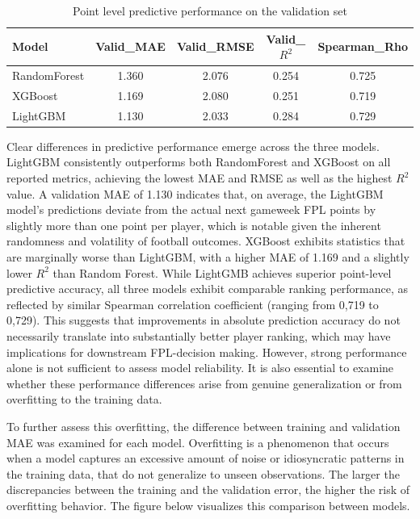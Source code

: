 \documentclass[11pt,a4paper]{article}
\begin{document}
\begin{table}[H]
\centering
\caption{Point level predictive performance on the validation set}
\label{tab:performance}
\begin{tabular}{|l|c|c|c|c|}
\hline
\textbf{Model} & \textbf{Valid\_MAE} & \textbf{Valid\_RMSE} & \textbf{Valid\_$R^2$} & \textbf{Spearman\_Rho}\\
\hline
RandomForest & 1.360 & 2.076 & 0.254 & 0.725 \\
XGBoost & 1.169 & 2.080 & 0.251 & 0.719\\
LightGBM & 1.130 & 2.033 & 0.284 & 0.729\\
\hline
\end{tabular}
\end{table}
Clear differences in predictive performance emerge across the three models. LightGBM consistently outperforms both RandomForest and XGBoost on all reported metrics,  achieving the lowest MAE and RMSE as well as the highest $R^2$ value. A validation MAE of 1.130 indicates that, on average, the LightGBM model’s predictions deviate from the actual next gameweek FPL points by slightly more than one point per player, which is notable given the inherent randomness and volatility of football outcomes. XGBoost exhibits statistics that are marginally worse than LightGBM, with a higher MAE of 1.169 and a slightly lower $R^2$ than Random Forest. While LightGMB achieves superior point-level predictive accuracy, all three models exhibit comparable ranking performance, as reflected by similar Spearman correlation coefficient (ranging from 0,719 to 0,729). This suggests that improvements in absolute prediction accuracy do not necessarily translate into substantially better player ranking, which may have implications for downstream FPL-decision making. However, strong performance alone is not sufficient to assess model reliability. It is also essential to examine whether these performance differences arise from genuine generalization or from overfitting to the training data. 

To further assess this overfitting, the difference between training and validation MAE was examined for each model. Overfitting is a phenomenon that occurs when a model captures an excessive amount of noise or idiosyncratic patterns in the training data, that do not generalize to unseen observations. The larger the discrepancies between the training and the validation error, the higher the risk of overfitting behavior. The figure below visualizes this comparison between models. 
\end{document}
